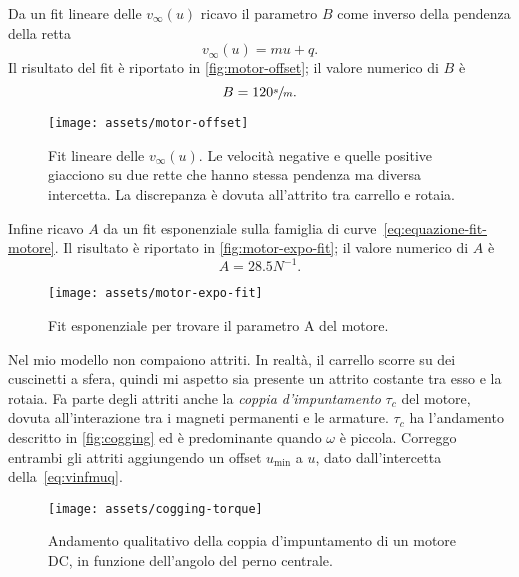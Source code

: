 Da un fit lineare delle $v_\infty(u)$ ricavo il parametro $B$ come inverso
della pendenza della retta
\begin{equation}
    v_\infty(u) = m u + q.
    \label{eq:vinfmuq}
\end{equation}
Il risultato del fit è riportato in \autoref{fig:motor-offset}; il valore
numerico di $B$ è
\begin{equation*}
    B = 120 \sfrac s m.
\end{equation*}

\begin{figure}[H]
    \centering
    \texttt{[image: assets/motor-offset]}
    \caption[Fit lineare delle velocità asintotiche del carrello]{
    Fit lineare delle $v_{\infty}(u)$. Le velocità negative e quelle positive
    giacciono su due rette che hanno stessa pendenza ma diversa intercetta.
    La discrepanza è dovuta all'attrito tra carrello e rotaia.
    }
    \label{fig:motor-offset}
\end{figure}

Infine ricavo $A$ da un fit esponenziale sulla famiglia di curve~\eqref{eq:equazione-fit-motore}.
Il risultato è riportato in \autoref{fig:motor-expo-fit}; il valore
numerico di $A$ è
\begin{equation*}
    A = 28.5 N^{-1}.
\end{equation*}

\begin{figure}[H]
    \centering
    \texttt{[image: assets/motor-expo-fit]}
    \caption[Fit esponenziale per i parametri del motore]{
    Fit esponenziale per trovare il parametro A del motore.
    }
    \label{fig:motor-expo-fit}
\end{figure}

Nel mio modello non compaiono attriti.
In realtà, il carrello scorre su dei cuscinetti a sfera,
quindi mi aspetto sia presente un attrito costante tra esso e la rotaia.
Fa parte degli attriti anche la \emph{coppia d'impuntamento} $\tau_c$ del motore,
dovuta all'interazione tra i magneti permanenti e le armature. $\tau_c$ ha
l'andamento descritto in \autoref{fig:cogging} ed è predominante quando $\omega$ è
piccola.
Correggo entrambi gli attriti aggiungendo un offset $u_{\min} $ a $u$, dato dall'intercetta della~\eqref{eq:vinfmuq}.

 

\begin{figure}[H]
    \centering
    \texttt{[image: assets/cogging-torque]}
    \caption[Coppia d'impuntamento]{Andamento qualitativo della coppia d'impuntamento
    di un motore DC, in funzione dell'angolo del perno centrale.}
    \label{fig:cogging}
\end{figure}
